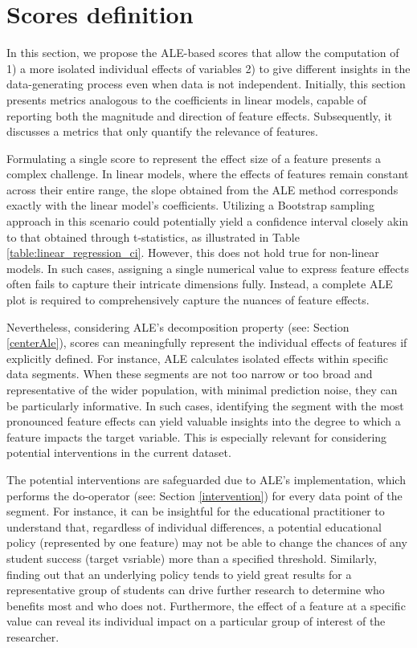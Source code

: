 \section{Scores definition}

In this section, we propose the ALE-based scores that allow the computation of 1) a more isolated individual effects of variables 2) to give different insights in the data-generating process even when data is not independent.   Initially, this section presents metrics analogous to the coefficients in linear models, capable of reporting both the magnitude and direction of feature effects. Subsequently, it discusses a metrics that only quantify the relevance of features.

Formulating a single score to represent the effect size of a feature presents a complex challenge. In linear models, where the effects of features remain constant across their entire range, the slope obtained from the ALE method corresponds exactly with the linear model's coefficients. Utilizing a Bootstrap sampling approach in this scenario could potentially yield a confidence interval closely akin to that obtained through t-statistics, as illustrated in Table \ref{table:linear_regression_ci}. However, this does not hold true for non-linear models. In such cases, assigning a single numerical value to express feature effects often fails to capture their intricate dimensions fully. Instead, a complete ALE plot is required to comprehensively capture the nuances of feature effects. 

Nevertheless, considering  ALE's decomposition property (see: Section \ref{centerAle}), scores can meaningfully represent the individual effects of features if explicitly defined. For instance, ALE calculates isolated effects within specific data segments. When these segments are not too narrow or too broad and representative of the wider population, with minimal prediction noise, they can be particularly informative. In such cases, identifying the segment with the most pronounced feature effects can yield valuable insights into the degree to which a feature impacts the target variable. This is especially relevant for considering potential interventions in the current dataset. 

The potential interventions are safeguarded due to ALE's implementation, which performs the do-operator (see: Section \ref{intervention}) for every data point of the segment. For instance, it can be insightful for the educational practitioner to understand that, regardless of individual differences, a potential educational policy (represented by one feature) may not be able to change the chances of any student success (target vsriable) more than a specified threshold. Similarly, finding out that an underlying policy tends to yield great results for a representative group of students can drive further research to determine who benefits most and who does not. Furthermore, the effect of a feature at a specific value can reveal its individual impact on a particular group of interest of the researcher. 

